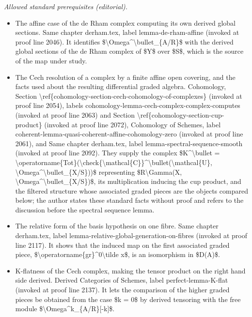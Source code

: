 \documentclass[10pt,a4paper]{amsart}
\theoremstyle{plain}
\theoremstyle{definition}
\theoremstyle{remark}
\numberwithin{equation}{subsection}
\begin{document}
\noindent\textit{Allowed standard prerequisites (editorial).}\begin{itemize}
\item The affine case of the de Rham complex computing its own derived global sections. Same chapter derham.tex, label lemma-de-rham-affine (invoked at proof line 2046). It identifies \$\textbackslash{}Omega\textasciicircum{}\textbackslash{}bullet\_\{A/R\}\$ with the derived global sections of the de Rham complex of \$Y\$ over \$S\$, which is the source of the map under study.
\item The Cech resolution of a complex by a finite affine open covering, and the facts used about the resulting differential graded algebra. Cohomology, Section \textbackslash{}ref\{cohomology-section-cech-cohomology-of-complexes\} (invoked at proof line 2054), labels cohomology-lemma-cech-complex-complex-computes (invoked at proof line 2063) and Section \textbackslash{}ref\{cohomology-section-cup-product\} (invoked at proof line 2072), Cohomology of Schemes, label coherent-lemma-quasi-coherent-affine-cohomology-zero (invoked at proof line 2061), and Same chapter derham.tex, label lemma-spectral-sequence-smooth (invoked at proof line 2092). They supply the complex \$K\textasciicircum{}\textbackslash{}bullet = \textbackslash{}operatorname\{Tot\}(\textbackslash{}check\{\textbackslash{}mathcal\{C\}\}\textasciicircum{}\textbackslash{}bullet(\textbackslash{}mathcal\{U\}, \textbackslash{}Omega\textasciicircum{}\textbackslash{}bullet\_\{X/S\}))\$ representing \$R\textbackslash{}Gamma(X, \textbackslash{}Omega\textasciicircum{}\textbackslash{}bullet\_\{X/S\})\$, its multiplication inducing the cup product, and the filtered structure whose associated graded pieces are the objects compared below; the author states these standard facts without proof and refers to the discussion before the spectral sequence lemma.
\item The relative form of the basis hypothesis on one fibre. Same chapter derham.tex, label lemma-relative-global-generation-on-fibres (invoked at proof line 2117). It shows that the induced map on the first associated graded piece, \$\textbackslash{}operatorname\{gr\}\textasciicircum{}0\textbackslash{}tilde x\$, is an isomorphism in \$D(A)\$.
\item K-flatness of the Cech complex, making the tensor product on the right hand side derived. Derived Categories of Schemes, label perfect-lemma-K-flat (invoked at proof line 2137). It lets the comparison of the higher graded pieces be obtained from the case \$k = 0\$ by derived tensoring with the free module \$\textbackslash{}Omega\textasciicircum{}k\_\{A/R\}[-k]\$.
\end{itemize}\medskip
\end{document}

